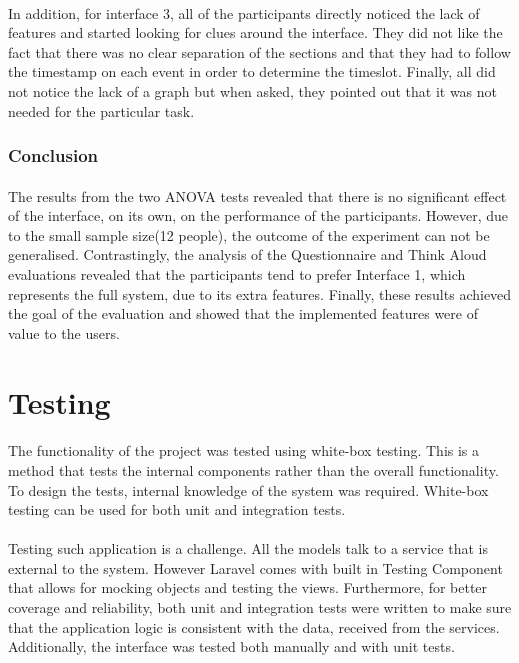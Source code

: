 \documentclass{l4proj}
\begin{document}
\paragraph{}
In addition, for interface 3, all of the participants directly noticed the lack of features and started looking for clues around the interface. They did not like the fact that there was no clear separation of the sections and that they had to follow the timestamp on each event in order to determine the timeslot. Finally, all did not notice the lack of a graph but when asked, they pointed out that it was not needed for the particular task.

\subsubsection{Conclusion}
\paragraph{}
The results from the two ANOVA tests revealed that there is no significant effect of the interface, on its own, on the performance of the participants. However, due to the small sample size(12 people), the outcome of the experiment can not be generalised. Contrastingly, the analysis of the Questionnaire and Think Aloud evaluations revealed that the participants tend to prefer Interface 1, which represents the full system, due to its extra features. Finally, these results achieved the goal of the evaluation and showed that the implemented features were of value to the users.       

\section{Testing}
\paragraph{}
The functionality of the project was tested using white-box testing. This is a method that tests the internal components rather than the overall functionality. To design the tests, internal knowledge of the system was required. White-box testing can be used for both unit and integration tests.
\paragraph{}
Testing such application is a challenge. All the models talk to a service that is external to the system. However Laravel comes with built in Testing Component that allows for mocking objects and testing the views. Furthermore, for better coverage and reliability, both unit and integration tests were written to make sure that the application logic is consistent with the data, received from the services. Additionally, the interface was tested both manually and with unit tests. 
\end{document}
